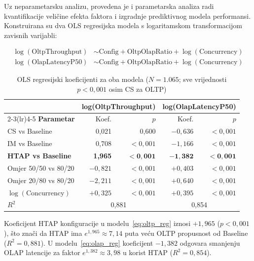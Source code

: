 Uz neparametarsku analizu, provedena je i parametarska analiza radi kvantifikacije veličine efekta faktora i izgradnje prediktivnog modela performansi. Konstruirana su dva OLS regresijska modela s logaritamskom transformacijom zavisnih varijabli:

\begin{align}
\log(\text{OltpThroughput}) &\sim \text{Config} + \text{OltpOlapRatio} + \log(\text{Concurrency}) \label{eq:oltp_reg} \\
\log(\text{OlapLatencyP50}) &\sim \text{Config} + \text{OltpOlapRatio} + \log(\text{Concurrency}) \label{eq:olap_reg}
\end{align}

\begin{table}[htbp]
\centering
\caption{OLS regresijski koeficijenti za oba modela ($N=1.065$; sve vrijednosti $p<0{,}001$ osim CS za OLTP)}
\label{tab:reg_oba}
\small
\begin{tabular}{lrrrr}
\toprule
 & \multicolumn{2}{c}{\textbf{log(OltpThroughput)}} & \multicolumn{2}{c}{\textbf{log(OlapLatencyP50)}} \\
\cmidrule(lr){2-3}\cmidrule(lr){4-5}
\textbf{Parametar} & Koef. & $p$ & Koef. & $p$ \\
\midrule
CS vs Baseline        &  0,021 & 0,600 & $-0,636$ & $<0,001$ \\
IM vs Baseline        &  0,708 & $<0,001$ & $-1,166$ & $<0,001$ \\
\textbf{HTAP vs Baseline} & \textbf{1,965} & $<\mathbf{0,001}$ & $\mathbf{-1,382}$ & $<\mathbf{0,001}$ \\
Omjer 50/50 vs 80/20  & $-0,821$ & $<0,001$ & $+0,403$ & $<0,001$ \\
Omjer 20/80 vs 80/20  & $-2,211$ & $<0,001$ & $+0,640$ & $<0,001$ \\
$\log(\text{Concurrency})$ & $+0,325$ & $<0,001$ & $+0,395$ & $<0,001$ \\
\midrule
$R^2$ & \multicolumn{2}{c}{0,881} & \multicolumn{2}{c}{0,854} \\
\bottomrule
\end{tabular}
\end{table}

Koeficijent HTAP konfiguracije u modelu~\eqref{eq:oltp_reg} iznosi $+1,965$ ($p<0,001$), što znači da HTAP ima $e^{1,965} \approx 7,14$ puta veću OLTP propusnost od Baseline ($R^2 = 0,881$). U modelu~\eqref{eq:olap_reg} koeficijent $-1,382$ odgovara smanjenju OLAP latencije za faktor $e^{1,382} \approx 3,98$ u korist HTAP ($R^2 = 0,854$).

